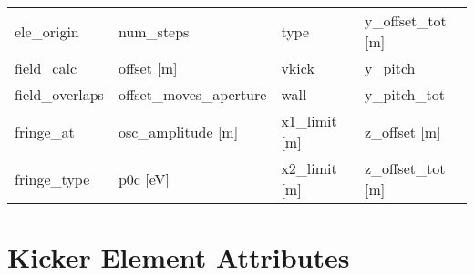 \begin{tabular}{llll}
ele_origin                     & num_steps                      & type                           & y_offset_tot [m]               \\
field_calc                     & offset [m]                     & vkick                          & y_pitch                        \\
field_overlaps                 & offset_moves_aperture          & wall                           & y_pitch_tot                    \\
fringe_at                      & osc_amplitude [m]              & x1_limit [m]                   & z_offset [m]                   \\
fringe_type                    & p0c [eV]                       & x2_limit [m]                   & z_offset_tot [m]               \\
 \bottomrule
 \end{tabular}
 \vfill

 \section{Kicker Element Attributes}
 \label{s:list.kicker}

